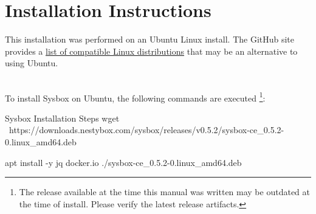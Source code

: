 \chapter{\sysbox Installation Instructions}\label{chap:sysbox_install}



This installation was performed on an Ubuntu Linux install.  
The \sysbox GitHub site provides a
\href{https://github.com/nestybox/sysbox/blob/master/docs/distro-compat.md#supported-linux-distros}{list of compatible Linux distributions}
that may be an alternative to using Ubuntu. 

\noindent\\To install Sysbox on Ubuntu, the following commands are executed
\footnote{The \sysbox release available at the time this manual was written may be outdated
at the time of install.  Please verify the latest release artifacts.}:

\begin{code}{Sysbox Installation Steps}{}{}
wget \
https://downloads.nestybox.com/sysbox/releases/v0.5.2/sysbox-ce_0.5.2-0.linux_amd64.deb

apt install -y jq docker.io ./sysbox-ce_0.5.2-0.linux_amd64.deb
\end{code}
